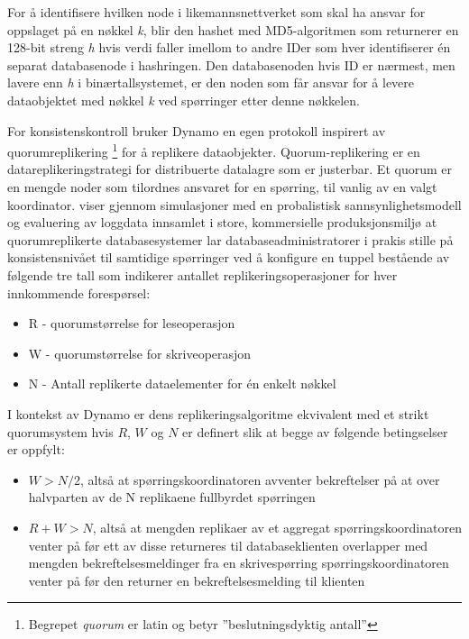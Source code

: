 For å identifisere hvilken node i likemannsnettverket som skal ha ansvar for oppslaget på en nøkkel \emph{k}, blir den hashet med MD5-algoritmen som returnerer en 128-bit streng \emph{h} hvis verdi faller imellom to andre IDer som hver identifiserer én separat databasenode i hashringen. Den databasenoden hvis ID er nærmest, men lavere enn \emph{h} i binærtallsystemet, er den noden som får ansvar for å levere dataobjektet med nøkkel \emph{k} ved spørringer etter denne nøkkelen.

For konsistenskontroll bruker Dynamo en egen protokoll inspirert av quorumreplikering \footnote{Begrepet \emph{quorum} er latin og betyr ''beslutningsdyktig antall''} for å replikere dataobjekter. Quorum-replikering er en datareplikeringstrategi for distribuerte datalagre som er justerbar. Et quorum er en mengde noder som tilordnes ansvaret for en spørring, til vanlig av en valgt koordinator. \cite{bailis2014} viser gjennom simulasjoner med en probalistisk sannsynlighetsmodell og evaluering av loggdata innsamlet i store, kommersielle produksjonsmiljø at quorumreplikerte databasesystemer lar databaseadministratorer i prakis stille på konsistensnivået til samtidige spørringer ved å konfigure en tuppel bestående av følgende tre tall som indikerer antallet replikeringsoperasjoner for hver innkommende forespørsel:

\begin{itemize}
  \item R - quorumstørrelse for leseoperasjon
  \item W - quorumstørrelse for skriveoperasjon
  \item N - Antall replikerte dataelementer for én enkelt nøkkel
\end{itemize}

I kontekst av Dynamo er dens replikeringsalgoritme ekvivalent med et strikt quorumsystem hvis \(R\), \(W\) og \(N\) er definert slik at begge av følgende betingselser er oppfylt:

\begin{itemize} \label{strictquorum}
  \item \(W > N/2\), altså at spørringskoordinatoren avventer bekreftelser på at over halvparten av de N replikaene fullbyrdet spørringen
  \item \(R + W > N\), altså at mengden replikaer av et aggregat spørringskoordinatoren venter på før ett av disse returneres til databaseklienten overlapper med mengden bekreftelsesmeldinger fra en skrivespørring spørringskoordinatoren venter på før den returner en bekreftelsesmelding til klienten
\end{itemize}

